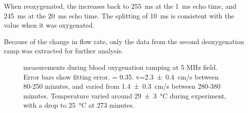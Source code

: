 When reoxygenated, the \Ttwo increases back to \SI{255}{ms} at the \SI{1}{ms} echo time, and \SI{245}{ms} at the \SI{20}{ms} echo time.
The splitting of \SI{10}{ms} is consistent with the value when it was oxygenated.

Because of the change in flow rate, only the data from the second deoxygenation ramp was extracted for further analysis.
\begin{figure}[h!tp]
\centering
{}



\caption[\Ttwo measurements during blood oxygenation ramping at 5 MHz field]{\Ttwo measurements during blood oxygenation ramping at 5 MHz field. Error bars show \Ttwo fitting error. \Hct = 0.35. v=\SI{2.3 \pm 0.4}{cm/s} between 80-250 minutes, and varied from \SI{1.4 \pm 0.3}{cm/s} between 280-380 minutes. Temperature varied around \SI{29 \pm 3}{\celsius} during experiment, with a drop to \SI{25}{\celsius} at 273 minutes.}
\label{fig:contflow-5mhzT2Time}
\end{figure}

